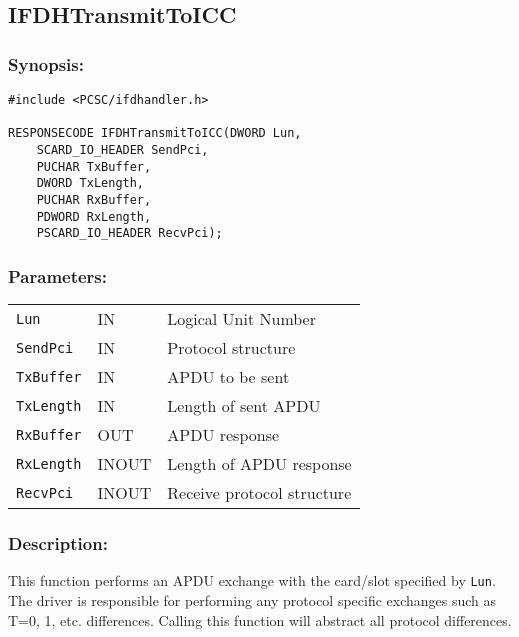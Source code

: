 \documentclass[a4paper,12pt]{article}
\newcommand{\synopsis}{\subsubsection{Synopsis:}}
\newcommand{\parameters}{\subsubsection{Parameters:}}
\newcommand{\desc}{\subsubsection{Description:}}
\begin{document}
\subsection{IFDHTransmitToICC}

\synopsis
\begin{verbatim}
#include <PCSC/ifdhandler.h>

RESPONSECODE IFDHTransmitToICC(DWORD Lun,
    SCARD_IO_HEADER SendPci,
    PUCHAR TxBuffer,
    DWORD TxLength,
    PUCHAR RxBuffer,
    PDWORD RxLength,
    PSCARD_IO_HEADER RecvPci);
\end{verbatim}

\parameters

\begin{tabular}{lll}
\texttt{Lun} & IN & Logical Unit Number\\
\texttt{SendPci} & IN & Protocol structure\\
\texttt{TxBuffer} & IN & APDU to be sent\\
\texttt{TxLength} & IN & Length of sent APDU\\
\texttt{RxBuffer} & OUT & APDU response\\
\texttt{RxLength} & INOUT & Length of APDU response\\
\texttt{RecvPci} & INOUT & Receive protocol structure
\end{tabular}

\desc

This function performs an APDU exchange with the card/slot specified by
\texttt{Lun}. The driver is responsible for performing any protocol
specific exchanges such as T=0, 1, etc. differences. Calling this function
will abstract all protocol differences.
\end{document}
